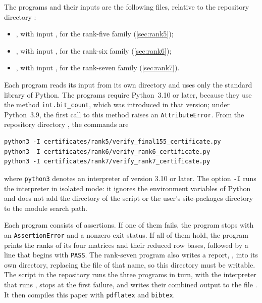 The programs and their inputs are the following files, relative to the repository
directory :
\begin{itemize}
\item {}, with input , for the rank-five family (\cref{sec:rank5});
\item {}, with input , for the rank-six family (\cref{sec:rank6});
\item {}, with input , for the rank-seven family (\cref{sec:rank7}).
\end{itemize}
Each program reads its input from its own directory and uses only the standard library of Python. The programs require Python~3.10 or later, because they use the method \texttt{int.bit\_count}, which was introduced in that version; under Python~3.9, the first call to this method raises an \texttt{AttributeError}. From the repository directory , the commands are
\begin{verbatim}
python3 -I certificates/rank5/verify_final155_certificate.py
python3 -I certificates/rank6/verify_rank6_certificate.py
python3 -I certificates/rank7/verify_rank7_certificate.py
\end{verbatim}
where \texttt{python3} denotes an interpreter of version 3.10 or later. The option \texttt{-I} runs the interpreter in isolated mode: it ignores the environment variables of Python and does not add the directory of the script or the user's site-packages directory to the module search path.

Each program consists of assertions. If one of them fails, the program stops with an \texttt{AssertionError} and a nonzero exit status. If all of them hold, the program prints the ranks of its four matrices and their reduced row bases, followed by a line that begins with \texttt{PASS}. The rank-seven program also writes a report, , into its own directory, replacing the file of that name, so this directory must be writable. The script  in the repository runs the three programs in turn, with the interpreter that runs , stops at the first failure, and writes their combined output to the file . It then compiles this paper with \texttt{pdflatex} and \texttt{bibtex}.

